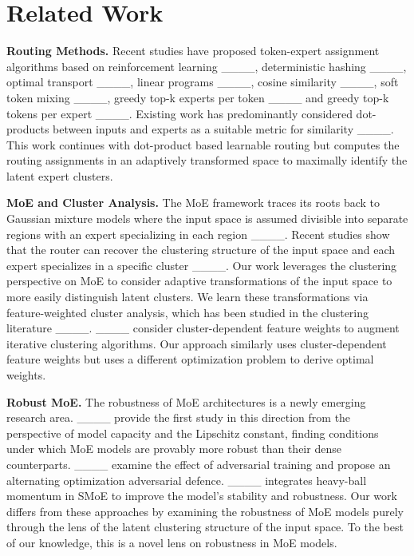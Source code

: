 \section{Related Work}
\label{sec: related work}

\textbf{Routing Methods.} Recent studies have proposed token-expert assignment algorithms based on reinforcement learning ____, deterministic hashing ____, optimal transport ____, linear programs ____, cosine similarity ____, soft token mixing ____, greedy top-k experts per token ____ and greedy top-k tokens per expert ____. Existing work has predominantly considered dot-products between inputs and experts as a suitable metric for similarity ____. This work continues with dot-product based learnable routing but computes the routing assignments in an adaptively transformed space to maximally identify the latent expert clusters.


\textbf{MoE and Cluster Analysis.} The MoE framework traces its roots back to Gaussian mixture models where the input space is assumed divisible into separate regions with an expert specializing in each region ____. Recent studies show that the router can recover the clustering structure of the input space and each expert specializes in a specific cluster ____. Our work leverages the clustering perspective on MoE to consider adaptive transformations of the input space to more easily distinguish latent clusters. We learn these transformations via feature-weighted cluster analysis, which has been studied in the clustering literature ____. ____ consider cluster-dependent feature weights to augment iterative clustering algorithms. Our approach similarly uses cluster-dependent feature weights but uses a different optimization problem to derive optimal weights. 

\textbf{Robust MoE.} The robustness of MoE architectures is a newly emerging research area. ____ provide the first study in this direction from the perspective of model capacity and the Lipschitz constant, finding conditions under which MoE models are provably more robust than their dense counterparts. ____ examine the effect of adversarial training and propose an alternating optimization adversarial defence. ____ integrates heavy-ball momentum in SMoE to improve the model’s stability and robustness. Our work differs from these approaches by examining the robustness of MoE models purely through the lens of the latent clustering structure of the input space. To the best of our knowledge, this is a novel lens on robustness in MoE models.
\vspace{-0.1in}

